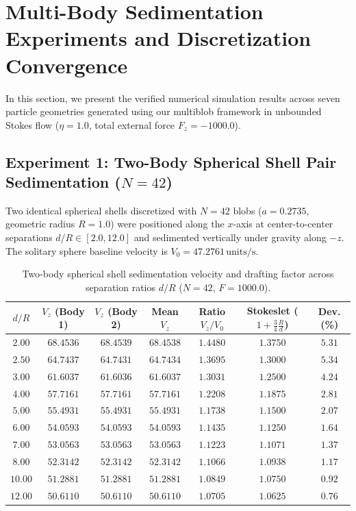 \documentclass[11pt,a4paper]{article}
\begin{document}
\section{Multi-Body Sedimentation Experiments and Discretization Convergence}

In this section, we present the verified numerical simulation results across seven particle geometries generated using our multiblob framework in unbounded Stokes flow ($\eta = 1.0$, total external force $F_z = -1000.0$).

\subsection{Experiment 1: Two-Body Spherical Shell Pair Sedimentation ($N = 42$)}

Two identical spherical shells discretized with $N = 42$ blobs ($a = 0.2735$, geometric radius $R = 1.0$) were positioned along the $x$-axis at center-to-center separations $d/R \in [2.0, 12.0]$ and sedimented vertically under gravity along $-z$. The solitary sphere baseline velocity is $V_0 = 47.2761\,\text{units/s}$.

\begin{table}[htbp]
\centering
\caption{Two-body spherical shell sedimentation velocity and drafting factor across separation ratios $d/R$ ($N = 42$, $F = 1000.0$).}
\label{tab:sphere_pair_scaling}
\begin{tabular}{ccccccc}
\toprule
$d/R$ & $V_z$ (Body 1) & $V_z$ (Body 2) & Mean $V_z$ & Ratio $V_z / V_0$ & Stokeslet ($1 + \frac{3}{4}\frac{R}{d}$) & Dev. (\%) \\
\midrule
$2.00$  & $68.4536$ & $68.4539$ & $68.4538$ & $1.4480$ & $1.3750$ & $5.31$ \\
$2.50$  & $64.7437$ & $64.7431$ & $64.7434$ & $1.3695$ & $1.3000$ & $5.34$ \\
$3.00$  & $61.6037$ & $61.6036$ & $61.6037$ & $1.3031$ & $1.2500$ & $4.24$ \\
$4.00$  & $57.7161$ & $57.7161$ & $57.7161$ & $1.2208$ & $1.1875$ & $2.81$ \\
$5.00$  & $55.4931$ & $55.4931$ & $55.4931$ & $1.1738$ & $1.1500$ & $2.07$ \\
$6.00$  & $54.0593$ & $54.0593$ & $54.0593$ & $1.1435$ & $1.1250$ & $1.64$ \\
$7.00$  & $53.0563$ & $53.0563$ & $53.0563$ & $1.1223$ & $1.1071$ & $1.37$ \\
$8.00$  & $52.3142$ & $52.3142$ & $52.3142$ & $1.1066$ & $1.0938$ & $1.17$ \\
$10.00$ & $51.2881$ & $51.2881$ & $51.2881$ & $1.0849$ & $1.0750$ & $0.92$ \\
$12.00$ & $50.6110$ & $50.6110$ & $50.6110$ & $1.0705$ & $1.0625$ & $0.76$ \\
\bottomrule
\end{tabular}
\end{table}
\end{document}
